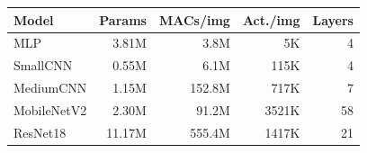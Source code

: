 \begin{tabular}{lrrrr}
\toprule
Model & Params & MACs/img & Act./img & Layers \\
\midrule
MLP & 3.81M & 3.8M & 5K & 4 \\
SmallCNN & 0.55M & 6.1M & 115K & 4 \\
MediumCNN & 1.15M & 152.8M & 717K & 7 \\
MobileNetV2 & 2.30M & 91.2M & 3521K & 58 \\
ResNet18 & 11.17M & 555.4M & 1417K & 21 \\
\bottomrule
\end{tabular}